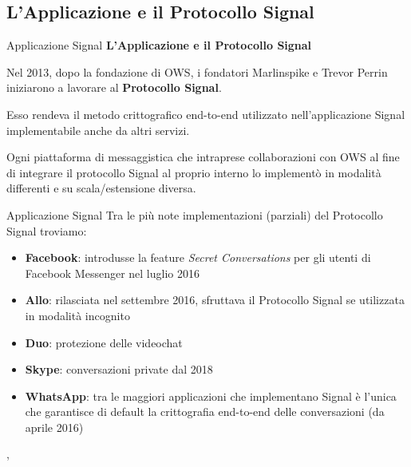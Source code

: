\subsection{L'Applicazione e il Protocollo Signal}

\begin{frame}{Applicazione Signal}
    \textbf{L'Applicazione e il Protocollo Signal}
    \newline
    
    Nel 2013, dopo la fondazione di OWS, i fondatori Marlinspike e Trevor Perrin iniziarono a lavorare al \textbf{Protocollo Signal}.\newline\pause
    
    Esso rendeva il metodo crittografico end-to-end utilizzato nell’applicazione Signal implementabile anche da altri servizi.\newline\pause
    
    Ogni piattaforma di messaggistica che intraprese collaborazioni con OWS al fine di integrare il protocollo Signal al proprio interno lo implementò in modalità differenti e su scala/estensione diversa.

\end{frame}

\begin{frame}{Applicazione Signal}
    Tra le più note implementazioni (parziali) del Protocollo Signal troviamo:\pause
    \begin{itemize}
        \item <1-> \textbf{Facebook}: introdusse la feature \textit{Secret Conversations} per gli utenti di Facebook Messenger nel luglio 2016\pause
        \item <2-> \textbf{Allo}: rilasciata nel settembre 2016, sfruttava il Protocollo Signal se utilizzata in modalità incognito\pause
        \item <3-> \textbf{Duo}: protezione delle videochat\pause
        \item <4-> \textbf{Skype}: conversazioni private dal 2018\pause
        \item <5-> \textbf{WhatsApp}: tra le maggiori applicazioni che implementano Signal è l’unica che garantisce di default la crittografia end-to-end delle conversazioni (da aprile 2016)
    \end{itemize}
    
    \cite{greenberg}, \cite{Lumb}
    
\end{frame}

